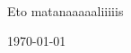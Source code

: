 \thispagestyle{empty}

~

\vspace{200pt}

\begin{center}
    {\Huge Eto matanaaaaaliiiiis}\par
	\vspace{10pt}
    \today
\end{center}

\newpage


